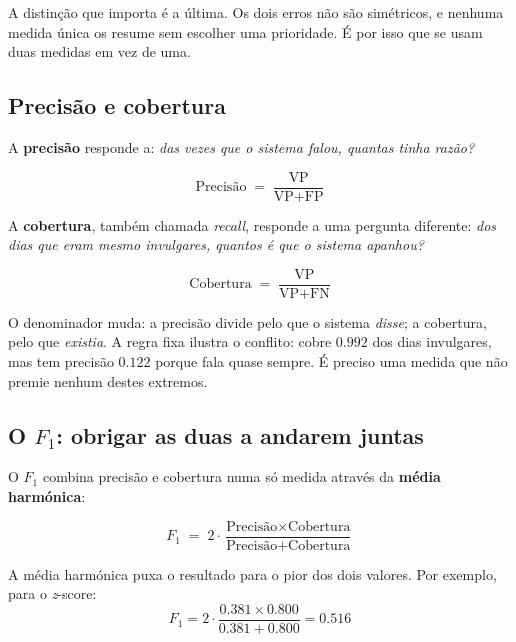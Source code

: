 A distinção que importa é a última. Os dois erros não são simétricos, e nenhuma medida única os
resume sem escolher uma prioridade. É por isso que se usam duas medidas em vez de uma.

\subsection{Precisão e cobertura}
\label{sec:av_prec_rec}

A \textbf{precisão} responde a: \emph{das vezes que o sistema falou, quantas tinha razão?}

\begin{equation}
  \text{Precisão} \;=\; \frac{\text{VP}}{\text{VP} + \text{FP}}
  \label{eq:precisao}
\end{equation}

A \textbf{cobertura}, também chamada \emph{recall}, responde a uma pergunta diferente:
\emph{dos dias que eram mesmo invulgares, quantos é que o sistema apanhou?}

\begin{equation}
  \text{Cobertura} \;=\; \frac{\text{VP}}{\text{VP} + \text{FN}}
  \label{eq:cobertura}
\end{equation}

O denominador muda: a precisão divide pelo que o sistema \emph{disse}; a cobertura, pelo que
\emph{existia}. A regra fixa ilustra o conflito: cobre $0.992$ dos dias invulgares, mas tem precisão
$0.122$ porque fala quase sempre. É preciso uma medida que não premie nenhum destes extremos.

\subsection{O \texorpdfstring{$F_1$}{F1}: obrigar as duas a andarem juntas}
\label{sec:av_f1}

O $F_1$ combina precisão e cobertura numa só medida através da \textbf{média harmónica}:

\begin{equation}
  F_1 \;=\; 2 \cdot \frac{\text{Precisão} \times \text{Cobertura}}
                         {\text{Precisão} + \text{Cobertura}}
  \label{eq:f1}
\end{equation}

A média harmónica puxa o resultado para o pior dos dois valores. Por exemplo, para o \emph{z}-score:
\begin{equation*}
  F_1 = 2 \cdot \frac{0.381 \times 0.800}{0.381 + 0.800}
      = 0.516
\end{equation*}


